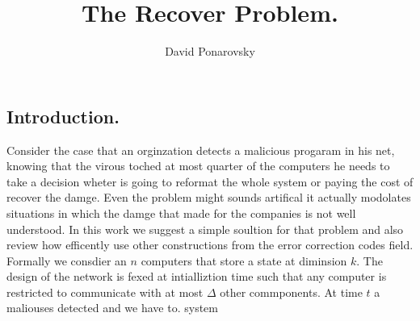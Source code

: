 

\title{ The Recover Problem.   } 
\author{David Ponarovsky}
\maketitle
{} 
\begin{multicols*}{2}

  \section{Introduction.} Consider the case that an orginzation detects a malicious progaram in his net, knowing that the virous toched at most quarter of the computers he needs to take a decision wheter is going to reformat the whole system or paying the cost of recover the damge. Even the problem might sounds artifical it actually modolates situations in which the damge that made for the companies is not well understood. In this work we suggest a simple soultion for that problem and also review how efficently use other constructions from the error correction codes field.
  Formally we consdier an $n$ computers that store a state at diminsion $k$. The design of the network is fexed at intialliztion time such that any computer is restricted to communicate with at most $\Delta$ other commponents. At time $t$ a maliouses detected and we have to.  system    

\end{multicols*}

